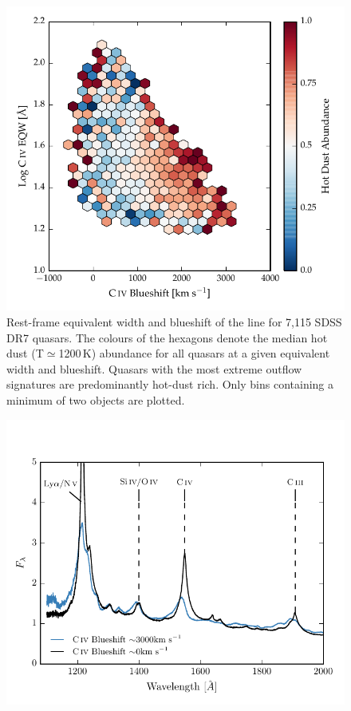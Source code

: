 \begin{figure}
\centering
  \includegraphics[width=\columnwidth]{figures/chapter05/hot_dust_beta.pdf}
\caption{Rest-frame equivalent width and blueshift of the  line for 7,115 SDSS DR7 quasars. The colours of the hexagons denote the median hot dust (T$\simeq$1200\,K) abundance for all quasars at a given equivalent width and blueshift. Quasars with the most extreme outflow signatures are predominantly hot-dust rich. Only bins containing a minimum of two objects are plotted. }
  \label{fig:hot_dust_beta}
\end{figure}

\begin{figure}
\centering
  \includegraphics[width=\columnwidth]{figures/chapter05/blueshift_composite.pdf}
\caption{}
  \label{fig:blueshift_composite}
\end{figure}

